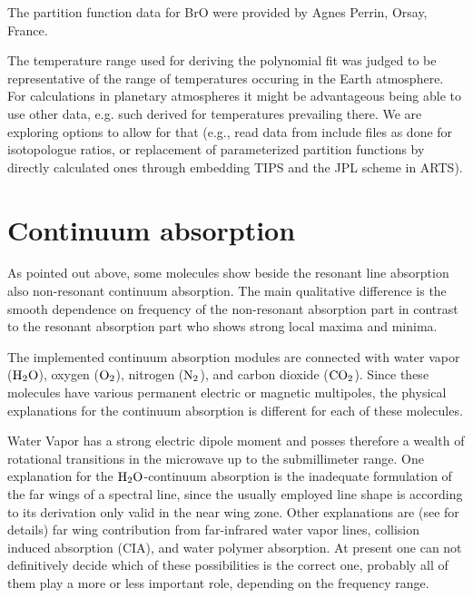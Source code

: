 The partition function data for BrO were provided by Agnes
Perrin, Orsay, France.

The temperature range used for deriving the polynomial fit was judged to be
representative of the range of temperatures occuring in the Earth atmosphere.
For calculations in planetary atmospheres it might be advantageous being able to
use other data, e.g. such derived for temperatures prevailing there. We are
exploring options to allow for that (e.g., read data from include files as
done for isotopologue ratios, or replacement of parameterized partition
functions by directly calculated ones through embedding TIPS and the JPL scheme
in ARTS).


\section{Continuum absorption}
\label{sec:abs_theory:ContAbs}

As pointed out above, some molecules show beside the resonant line
absorption also non-resonant continuum absorption. The main qualitative
difference is the smooth dependence on frequency of the non-resonant
absorption part in contrast to the resonant absorption part who shows 
strong local maxima and minima.

The implemented continuum absorption modules are connected with water
vapor ($\mbox{H}_2\mbox{O}$), oxygen ($\mbox{O}_2$), nitrogen ($\mbox{N}_2$), and carbon dioxide
($\mbox{CO}_2$). Since these molecules have various permanent electric or magnetic
multipoles, the physical explanations for the continuum absorption is 
different for each of these molecules.

Water Vapor has a strong electric dipole moment and posses therefore a 
wealth of rotational transitions in the microwave up to the submillimeter 
range. One explanation for the $\mbox{H}_2\mbox{O}$-continuum absorption is the inadequate 
formulation of the far wings of a spectral line, since the usually employed 
\citet{vanvleck:45} line shape is according to its derivation only valid 
in the near wing zone. Other explanations are (see \citet{pwr:93} for details) 
far wing contribution from far-infrared water vapor lines, collision induced 
absorption (CIA), and water polymer absorption. At present one can not definitively 
decide which of these possibilities is the correct one, probably all of them 
play a more or less important role, depending on the frequency range.

